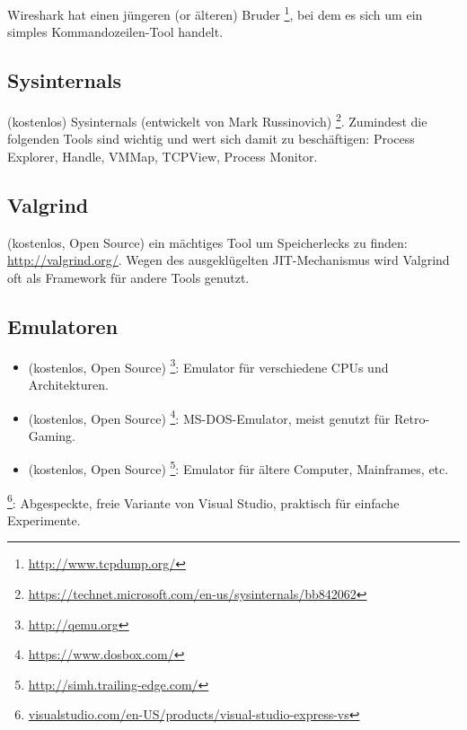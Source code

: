 Wireshark hat einen jüngeren (or älteren) Bruder \footnote{\url{http://www.tcpdump.org/}},
bei dem es sich um ein simples Kommandozeilen-Tool handelt.

\subsection{Sysinternals}

(kostenlos) Sysinternals (entwickelt von Mark Russinovich)
\footnote{\url{https://technet.microsoft.com/en-us/sysinternals/bb842062}}.
Zumindest die folgenden Tools sind wichtig und wert sich damit zu beschäftigen:
Process Explorer, Handle, VMMap, TCPView, Process Monitor.

\subsection{Valgrind}

(kostenlos, Open Source) ein mächtiges Tool um Speicherlecks zu finden: \url{http://valgrind.org/}.
Wegen des ausgeklügelten \ac{JIT}-Mechanismus wird Valgrind oft als Framework für andere Tools genutzt.


\subsection{Emulatoren}

\begin{itemize}
\item (kostenlos, Open Source) \footnote{\url{http://qemu.org}}: Emulator für verschiedene CPUs und Architekturen.

\item (kostenlos, Open Source) \footnote{\url{https://www.dosbox.com/}}: MS-DOS-Emulator, meist genutzt für Retro-Gaming.

\item (kostenlos, Open Source) \footnote{\url{http://simh.trailing-edge.com/}}: Emulator für ältere Computer, Mainframes, etc.
\end{itemize}


\footnote{\href{http://go.yurichev.com/17034}{visualstudio.com/en-US/products/visual-studio-express-vs}}:
Abgespeckte, freie Variante von Visual Studio, praktisch für einfache Experimente.

